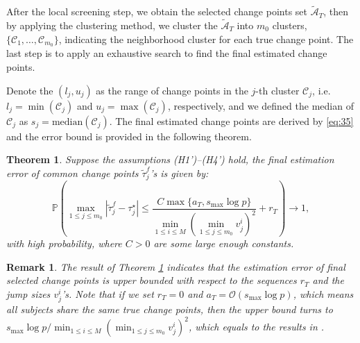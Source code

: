 \documentclass[11pt]{article}
\newtheorem{theorem}{Theorem}
\newtheorem{remark}{Remark}
\begin{document}
After the local screening step, we obtain the selected change points set $\widetilde{\mathcal{A}}_T$, then by applying the clustering method, we cluster the $\widetilde{\mathcal{A}}_T$ into $m_0$ clusters, $\{\mathcal{C}_1, \dots, \mathcal{C}_{m_0}\}$, indicating the neighborhood cluster for each true change point. The last step is to apply an exhaustive search to find the final estimated change points. 

Denote the $(l_j, u_j)$ as the range of change points in the $j$-th cluster $\mathcal{C}_j$, i.e. $l_j = \min(\mathcal{C}_j)$ and $u_j = \max(\mathcal{C}_j)$, respectively, and we defined the median of $\mathcal{C}_j$ as $s_j = \text{median}(\mathcal{C}_j)$. The final estimated change points are derived by \eqref{eq:35} and the error bound is provided in the following theorem. 
\begin{theorem}
    \label{thm:3}
    Suppose the assumptions (H1')--(H4') hold, the final estimation error of common change points $\widetilde{\tau}^f_j$'s is given by:
    \begin{equation*}
        \mathbb{P}\left( \max_{1\leq j \leq m_0}\left| \widetilde{\tau}_j^f - \tau_j^\star \right| \leq \frac{C\max\{a_T, s_{\max}\log p\}}{\min_{1\leq i \leq M}(\min_{1\leq j \leq m_0}v_j^i)^2} + r_T \right) \to 1,
    \end{equation*}
    with high probability, where $C>0$ are some large enough constants.
\end{theorem}

\begin{remark}
The result of Theorem \ref{thm:3} indicates that the estimation error of final selected change points is upper bounded with respect to the sequences $r_T$ and the jump sizes $v_j^i$'s. Note that if we set $r_T = 0$ and $a_T = \mathcal{O}(s_{\max}\log p)$, which means all subjects share the same true change points, then the upper bound turns to $s_{\max}\log p / \min_{1\leq i\leq M}(\min_{1\leq j\leq m_0}v_j^i)^2$, which equals to the results in \cite{wang2019localizing}.
\end{remark}
\end{document}
